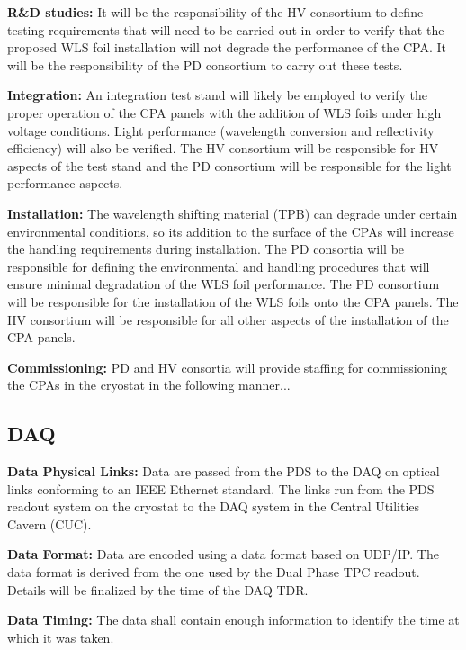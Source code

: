 \textbf{R\&D studies: }It will be the responsibility of the HV consortium to define testing requirements that will need to be carried out in order to verify that the proposed WLS foil installation will not degrade the performance of the CPA. It will be the responsibility of the PD consortium to carry out these tests.

\textbf{Integration:} An integration test stand will likely be employed to verify the proper operation of the CPA panels with the addition of WLS foils under high voltage conditions. Light performance (wavelength conversion and reflectivity efficiency) will also be verified. The HV consortium will be responsible for HV aspects of the test stand and the PD consortium will be responsible for the light performance aspects.

\textbf{Installation:} The wavelength shifting material (TPB) can degrade under certain environmental conditions, so its addition to the surface of the CPAs will increase the handling requirements during installation. The PD consortia will be responsible for defining the environmental and handling procedures that will ensure minimal degradation of the WLS foil performance. The PD consortium will be responsible for the installation of the WLS foils onto the CPA panels. The HV consortium will be responsible for all other aspects of the installation of the CPA panels.

\textbf{Commissioning:} PD and HV consortia will provide staffing for commissioning the CPAs in the cryostat in the following manner...


\subsection{DAQ}
\label{sec:fdsp-pd-intfc-daq}

\hspace{0.5cm}\textbf{Data Physical Links: }Data are passed from the PDS to the DAQ on optical links conforming to an IEEE Ethernet standard. The links run from the PDS readout system on the cryostat to the DAQ system in the Central Utilities Cavern (CUC).

\textbf{Data Format:} Data are encoded using a data format based on UDP/IP. The data format is derived from the one used by the Dual Phase TPC readout. Details will be finalized by the time of the DAQ TDR.

\textbf{Data Timing:} The data shall contain enough information to identify the time  at which it was taken.

